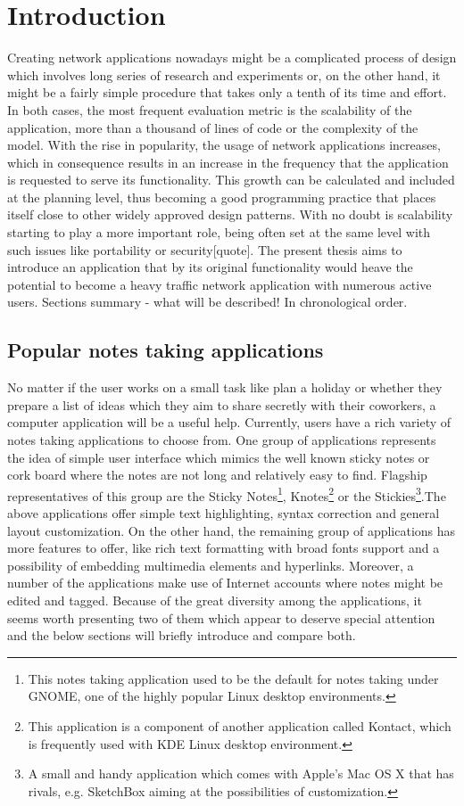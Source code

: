 \chapter{Introduction}
\label{sec:Introduction}
Creating network applications nowadays might be a complicated process of design which involves long series of research and experiments or, on the other hand, it might be a fairly simple procedure that takes only a tenth of its time and effort. In both cases, the most frequent evaluation metric is the scalability of the application, more than a thousand of lines of code or the complexity of the model. With the rise in popularity, the usage of network applications increases, which in consequence results in an increase in the frequency that the application is requested to serve its functionality. This growth can be calculated and included at the planning level, thus becoming a good programming practice that places itself close to other widely approved design patterns. With no doubt is scalability starting to play a more important role, being often set at the same level with such issues like portability or security[quote]. The present thesis aims to introduce an application that by its original functionality would heave the potential to become a heavy traffic network application with numerous active users.
Sections summary - what will be described! In chronological order.

\section{Popular notes taking applications}\label{sec:popular_apps} 
No matter if the user works on a small task like plan a holiday or whether they prepare a list of ideas which they aim to share secretly with their coworkers, a computer application will be a useful help.     
Currently, users have a rich variety of notes taking applications to choose from. One group of applications represents the idea of simple user interface which mimics the well known sticky notes or cork board where the notes are not long and relatively easy to find. Flagship representatives of this group are the Sticky Notes\footnote{This notes taking application used to be the default for notes taking under GNOME, one of the highly popular Linux desktop environments.}, Knotes\footnote{This application is a component of another application called Kontact, which is frequently used with KDE Linux desktop environment.} or the Stickies\footnote{A small and handy application which comes with Apple's Mac OS X that has rivals, e.g. SketchBox aiming at the possibilities of customization.}.The above applications offer simple text highlighting, syntax correction and general layout customization. On the other hand, the remaining group of applications has more features to offer, like rich text formatting with broad fonts support and a possibility of embedding multimedia elements and hyperlinks. Moreover, a number of the applications make use of Internet accounts where notes might be edited and tagged. Because of the great diversity among the applications, it seems worth presenting two of them which appear to deserve special attention and the below sections will briefly introduce and compare both.


